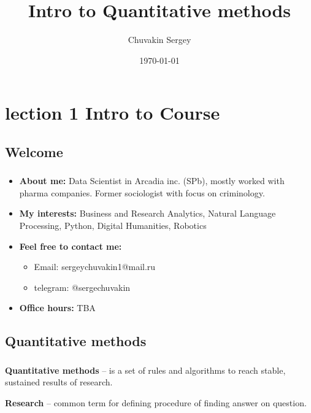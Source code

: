 \documentclass[t, 11pt]{beamer}
\title{Intro to Quantitative methods}
\subtitle{}
\author{Chuvakin Sergey}
\date{\today}
\institute[<<Anthropology>>]{<<School of Advanced Studies>>}
\begin{document}
	
	\frame[plain]{\titlepage}
	
	\section{lection 1 Intro to Course}
	
	
	\subsection{Welcome}
	\begin{frame} \label {welcome}
		\frametitle{\insertsection} 
		\frametitle{\insertsubsection} 
		\begin{itemize}
			\item \textbf{About me:} Data Scientist in Arcadia inc. (SPb), mostly worked with pharma companies. Former sociologist with focus on criminology. 
			\item \textbf{My interests:} Business and Research Analytics, Natural Language Processing, Python, Digital Humanities, Robotics
			\item \textbf{Feel free to contact me:} \begin{itemize}
				\item Email: sergeychuvakin1@mail.ru
				\item telegram: @sergechuvakin
			\end{itemize}
			\item \textbf{Office hours:} TBA
		\end{itemize}
	\end{frame}
	
	\subsection{Quantitative methods}
	\begin{frame}\label{}
		\frametitle{\insertsection}
		\frametitle{\insertsubsection}
		
		\textbf{Quantitative methods} -- is a set of rules and algorithms to reach stable, sustained results of research. 
		
		\textbf{Research} -- common term for defining procedure of finding answer on question.
		
	\end{frame}
	
	
	
\end{document}
